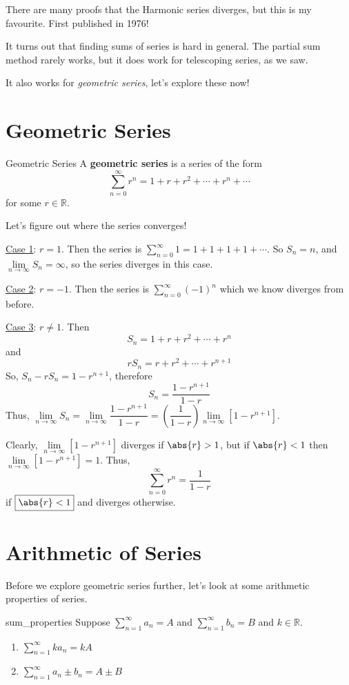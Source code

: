 \begin{Remark}{}{}
    There are many proofs that the Harmonic series diverges, but this is my favourite.
    First published in 1976!
\end{Remark}
It turns out that finding sums of series is hard in general. The partial
sum method rarely works, but it does work for telescoping series, as we saw.

It also works for \emph{geometric series}, let's explore these now!

\section{Geometric Series}
\begin{Definition}{Geometric Series}{}
    A \textbf{geometric series} is a series of the form
    \[ \sum\limits_{n=0}^{\infty} r^n=1+r+r^2+\cdots+r^n+\cdots \]
    for some $ r\in\mathbb{R} $.
\end{Definition}
Let's figure out where the series converges!

\underline{Case 1}: $ r=1 $. Then the series is
$ \sum\limits_{n=0}^{\infty} 1=1+1+1+1+\cdots $.
So $ S_n=n $, and $ \lim\limits_{{n} \to {\infty}} S_n =\infty $, so the series
diverges in this case.

\underline{Case 2}: $ r=-1 $. Then the series is $ \sum\limits_{n=0}^{\infty} (-1)^n $
which we know diverges from before.

\underline{Case 3}: $ r\neq 1 $. Then
\[ S_n=1+r+r^2+\cdots+r^n \]
and
\[ rS_n=r+r^2+\cdots+r^{n+1} \]
So, $ S_n-rS_n=1-r^{n+1} $, therefore
\[ S_n=\frac{1-r^{n+1}}{1-r} \]
Thus, $ \lim\limits_{{n} \to {\infty}} S_n=\lim\limits_{{n} \to {\infty}} \dfrac{1-r^{n+1}}{1-r}
    =
    \left( \dfrac{1}{1-r} \right) \lim\limits_{{n} \to {\infty}} \left[1-r^{n+1}\right] $.

Clearly, $ \lim\limits_{{n} \to {\infty}} \left[1-r^{n+1}\right] $ diverges if $ \abs{r}>1 $,
but if $ \abs{r}<1 $ then $ \lim\limits_{{n} \to {\infty}} \left[1-r^{n+1}\right]=1 $.
Thus,
\[ \boxed{ \sum\limits_{n=0}^{\infty} r^n=\frac{1}{1-r}} \]
if $ \boxed{\abs{r}<1} $ and diverges otherwise.

\section{Arithmetic of Series}
Before we explore geometric series further, let's look at some arithmetic properties of series.

\begin{Theorem}{}{sum_properties}
    Suppose $ \sum\limits_{n=1}^{\infty} a_n=A $ and $ \sum\limits_{n=1}^{\infty} b_n=B $
    and $ k\in\mathbb{R} $.
    \begin{enumerate}[label=(\arabic*)]
        \item $ \sum\limits_{n=1}^{\infty} ka_n=kA $
        \item $ \sum\limits_{n=1}^{\infty} a_n\pm b_n=A\pm B $
    \end{enumerate}
\end{Theorem}

